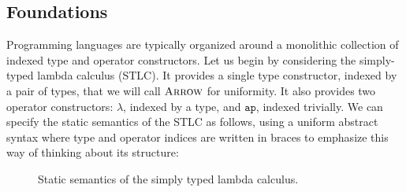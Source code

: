 \subsection{Foundations}\label{foundations}
Programming languages are typically organized around a monolithic collection of indexed type and operator constructors. Let us begin by considering the simply-typed lambda calculus (STLC). It provides a single type constructor, indexed by a pair of types, that we will call $\fvar{Arrow}$ for uniformity. It also provides two operator constructors: $\lambda$, indexed by a type, and $\texttt{ap}$, indexed trivially. We can specify the static semantics of the STLC as follows, using a uniform abstract syntax where type and operator indices are written in braces to emphasize this way of thinking about its structure:
\begin{figure}[h]
\small
\vspace{-8pt}
\begin{mathpar}


\end{mathpar}
\vspace{-8pt}
\caption{Static semantics of the simply typed lambda calculus.}
\end{figure}

